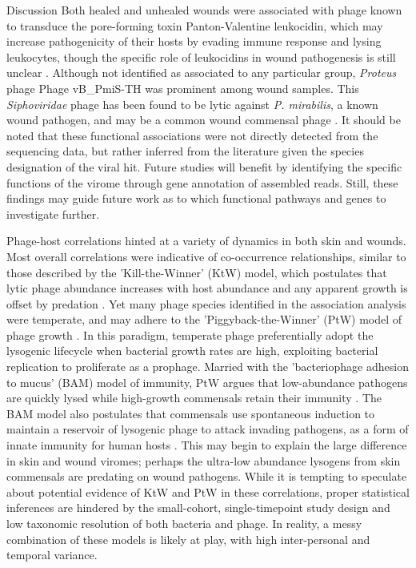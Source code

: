 \documentclass[oneside,12pt,final]{sty/ucthesis-CA2012}
\begin{document}
\begin{mainmatter}
\begin{section}{Discussion}
Both healed and unhealed wounds were associated with phage known to transduce the pore-forming toxin Panton-Valentine leukocidin, which may increase pathogenicity of their hosts by evading immune response and lysing leukocytes, though the specific role of leukocidins in wound pathogenesis is still unclear \cite{RN152}. Although not identified as associated to any particular group, \textit{Proteus} phage Phage vB\_PmiS-TH was prominent among wound samples. This \textit{Siphoviridae} phage has been found to be lytic against \textit{P. mirabilis}, a known wound pathogen, and may be a common wound commensal phage \cite{RN196}. It should be noted that these functional associations were not directly detected from the sequencing data, but rather inferred from the literature given the species designation of the viral hit. Future studies will benefit by identifying the specific functions of the virome through gene annotation of assembled reads. Still, these findings may guide future work as to which functional pathways and genes to investigate further. 
 
Phage-host correlations hinted at a variety of dynamics in both skin and wounds. Most overall correlations were indicative of co-occurrence relationships, similar to those described by the 'Kill-the-Winner' (KtW) model, which postulates that lytic phage abundance increases with host abundance and any apparent growth is offset by predation \cite{RN162}. Yet many phage species identified in the association analysis were temperate, and may adhere to the 'Piggyback-the-Winner' (PtW) model of phage growth \cite{RN155}. In this paradigm, temperate phage preferentially adopt the lysogenic lifecycle when bacterial growth rates are high, exploiting bacterial replication to proliferate as a prophage. Married with the 'bacteriophage adhesion to mucus' (BAM) model of immunity, PtW argues that low-abundance pathogens are quickly lysed while high-growth commensals retain their immunity \cite{RN155}. The BAM model also postulates that commensals use spontaneous induction to maintain a reservoir of lysogenic phage to attack invading pathogens, as a form of innate immunity for human hosts \cite{RN144}. This may begin to explain the large difference in skin and wound viromes; perhaps the ultra-low abundance lysogens from skin commensals are predating on wound pathogens. While it is tempting to speculate about potential evidence of KtW and PtW in these correlations, proper statistical inferences are hindered by the small-cohort, single-timepoint study design and low taxonomic resolution of both bacteria and phage. In reality, a messy combination of these models is likely at play, with high inter-personal and temporal variance.


\end{section}
\end{mainmatter}
\end{document}
